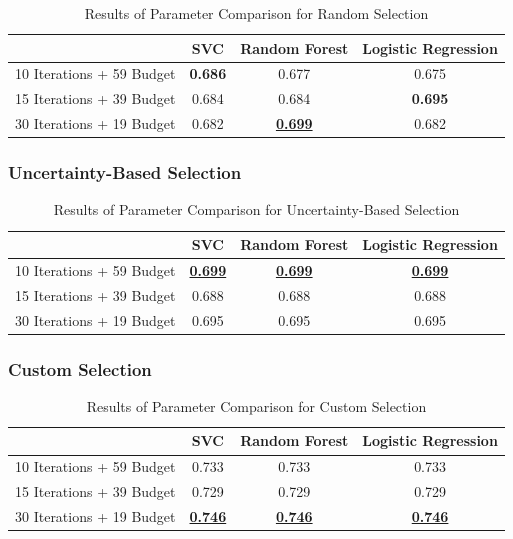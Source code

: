 \documentclass[12pt]{article}
\begin{document}
\begin{table}[H]
    \centering
    \begin{tabular}{|c|c|c|c|}
        \hline
        & SVC & Random Forest & Logistic Regression \\
        \hline
        10 Iterations + 59 Budget & \textbf{0.686} & 0.677 & 0.675 \\
        15 Iterations + 39 Budget & 0.684 & 0.684 & \textbf{0.695} \\
        30 Iterations + 19 Budget & 0.682 & \underline{\textbf{0.699}} & 0.682 \\
        \hline
    \end{tabular}
    \caption{Results of Parameter Comparison for Random Selection}
\end{table}

\subsubsection*{Uncertainty-Based Selection}

\begin{table}[H]
    \centering
    \begin{tabular}{|c|c|c|c|}
        \hline
        & SVC & Random Forest & Logistic Regression \\
        \hline
        10 Iterations + 59 Budget & \underline{\textbf{0.699}} & \underline{\textbf{0.699}} & \underline{\textbf{0.699}} \\
        15 Iterations + 39 Budget & 0.688 & 0.688 & 0.688 \\
        30 Iterations + 19 Budget & 0.695 & 0.695 & 0.695 \\
        \hline
    \end{tabular}
    \caption{Results of Parameter Comparison for Uncertainty-Based Selection}
\end{table}


\subsubsection*{Custom Selection}

\begin{table}[H]
    \centering
    \begin{tabular}{|c|c|c|c|}
        \hline
        & SVC & Random Forest & Logistic Regression \\
        \hline
        10 Iterations + 59 Budget & 0.733 & 0.733 & 0.733 \\
        15 Iterations + 39 Budget & 0.729 & 0.729 & 0.729 \\
        30 Iterations + 19 Budget & \underline{\textbf{0.746}} & \underline{\textbf{0.746}} & \underline{\textbf{0.746}} \\
        \hline
    \end{tabular}
    \caption{Results of Parameter Comparison for Custom Selection}
\end{table}
\end{document}
